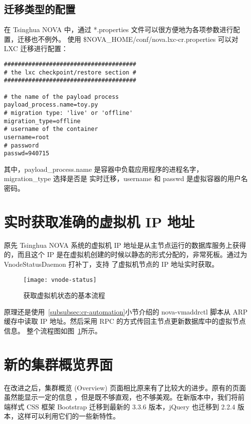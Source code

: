 \subsection{迁移类型的配置}

在 Tsinghua NOVA 中，通过 *.properties 文件可以很方便地为各项参数进行配置，迁移也不例外。
使用 \$NOVA\_HOME/conf/nova.lxc-cr.properties 可以对 LXC 迁移进行配置：

\begin{lstlisting}
######################################
# the lxc checkpoint/restore section #
######################################

# the name of the payload process
payload_process.name=toy.py
# migration type: 'live' or 'offline'
migration_type=offline
# username of the container
username=root
# password
passwd=940715
\end{lstlisting}

其中，payload\_process.name 是容器中负载应用程序的进程名字，migration\_type 选择是否是
实时迁移，username 和 passwd 是虚拟容器的用户名密码。

\section{实时获取准确的虚拟机 IP 地址}

原先 Tsinghua NOVA 系统的虚拟机 IP 地址是从主节点运行的数据库服务上获得的，而且这个 IP
是在虚拟机创建的时候以静态的形式分配的，非常死板。通过为 VnodeStatusDaemon 打补丁，支持
了虚拟机节点的 IP 地址实时获取。

\begin{figure}[h]
    \centering
    \texttt{[image: vnode-status]}
    \caption{获取虚拟机状态的基本流程}
    \label{fig:vnode-status}
\end{figure}

原理还是使用~\ref{subsubsec:cr-automation}小节介绍的 nova-vmaddrctl 脚本从 ARP 缓存中读取 IP
地址。然后采用 RPC 的方式传回主节点更新数据库中的虚拟节点信息。
整个流程图如图~\ref{fig:vnode-status}所示。

\section{新的集群概览界面}

在改进之后，集群概览 (Overview) 页面相比原来有了比较大的进步。原有的页面虽然能显示一定的信息
，但是既不够直观，也不够美观。在新版本中，我们将前端样式 CSS 框架 Bootstrap 迁移到最新的
3.3.6 版本，jQuery 也迁移到 2.2.4 版本，这样可以利用它们的一些新特性。

